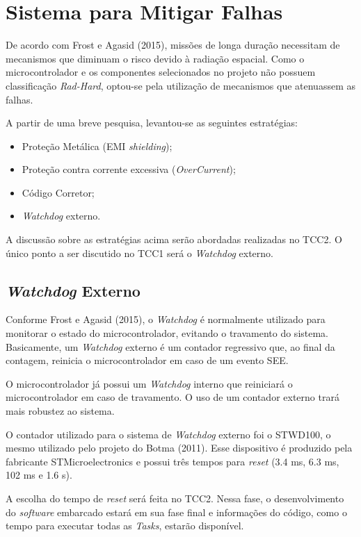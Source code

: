 \newpage

\section{Sistema para Mitigar Falhas}

De acordo com  Frost e Agasid (2015), missões de longa duração necessitam de mecanismos que diminuam o risco devido à radiação espacial. Como o microcontrolador e os componentes selecionados no projeto não possuem classificação \textit{Rad-Hard}, optou-se pela utilização de mecanismos que atenuassem as falhas. 

A partir de uma breve pesquisa, levantou-se as seguintes estratégias:
\begin{itemize}
\item Proteção Metálica (EMI \textit{shielding});
\item Proteção contra corrente excessiva (\textit{OverCurrent});
\item Código Corretor;
\item \textit{Watchdog} externo.
\end{itemize}

A discussão sobre as estratégias acima serão abordadas realizadas no TCC2. O único ponto a ser discutido no TCC1 será o \textit{Watchdog} externo.



\subsection{\textit{Watchdog} Externo}

Conforme  Frost e Agasid (2015), o \textit{Watchdog}  é normalmente utilizado para monitorar o estado do microcontrolador, evitando o travamento do sistema. Basicamente, um \textit{Watchdog} externo é um contador regressivo que, ao final da contagem, reinicia o microcontrolador em caso de um evento SEE. 
	
    O microcontrolador já possui um \textit{Watchdog} interno que reiniciará o microcontrolador em caso de travamento. O uso de um contador externo trará mais robustez ao sistema.
    
	O contador utilizado para o sistema de \textit{Watchdog} externo foi o STWD100, o mesmo utilizado pelo projeto do Botma (2011). Esse dispositivo é produzido pela fabricante STMicroelectronics e possui três tempos para \textit{reset} (3.4 ms, 6.3 ms, 102 ms e 1.6 s).  

A escolha do tempo de \textit{reset} será feita no TCC2. Nessa fase, o desenvolvimento do \textit{software} embarcado estará em sua fase final e informações do código, como o tempo para executar todas as \textit{Tasks}, estarão disponível.

